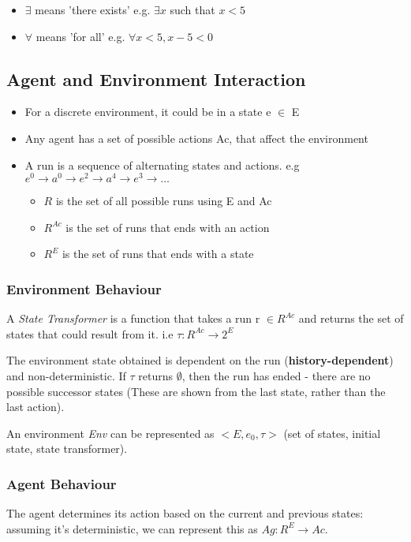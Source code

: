 \begin{itemize}
    \item $\exists$ means 'there exists' e.g. $\exists x$ such that $x<5$
    \item $\forall$ means 'for all' e.g. $\forall x < 5, x-5 < 0$
\end{itemize}

\subsection{Agent and Environment Interaction}
\begin{itemize}
    \item For a discrete environment, it could be in a state e $\in$ E
    \item Any agent has a set of possible actions Ac, that affect the environment 
    \item A run is a sequence of alternating states and actions. e.g $e^0 \rightarrow a^0 \rightarrow e^2 \rightarrow a^4 \rightarrow e^3 \rightarrow \ldots$
    \begin{itemize}
        \item $R$ is the set of all possible runs using E and Ac
        \item $R^{Ac}$ is the set of runs that ends with an action
        \item $R^{E}$ is the set of runs that ends with a state
    \end{itemize}
\end{itemize}

\subsubsection{Environment Behaviour}
A \emph{State Transformer} is a function that takes a run r $\in R^{Ac}$ and returns the set of states that could result from it. i.e $\tau:R^{Ac}\rightarrow2^E$

The environment state obtained is dependent on the run (\textbf{history-dependent}) and non-deterministic. If $\tau$ returns $\emptyset$, then the run has ended - there are no possible successor states (These are shown from the last state, rather than the last action).

An environment \emph{Env} can be represented as $<E, e_{0}, \tau >$ (set of states, initial state, state transformer). 

\subsubsection{Agent Behaviour}
The agent determines its action based on the current and previous states: assuming it's deterministic, we can represent this as $Ag: R^{E}\rightarrow Ac$. 

